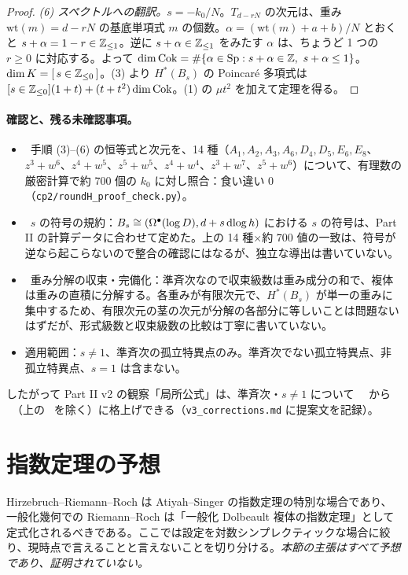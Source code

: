 \begin{proof}
\emph{(6) スペクトルへの翻訳。}$s=-k_0/N$。$T_{d-rN}$ の次元は、重み $\mathrm{wt}(m)=d-rN$ の基底単項式 $m$ の個数。$\alpha=(\mathrm{wt}(m)+a+b)/N$ とおくと $s+\alpha=1-r\in\mathbb Z_{\le1}$。逆に $s+\alpha\in\mathbb Z_{\le1}$ をみたす $\alpha$ は、ちょうど 1 つの $r\ge0$ に対応する。よって $\dim\mathrm{Cok}=\#\{\alpha\in\mathrm{Sp}:s+\alpha\in\Z,\ s+\alpha\le1\}$。$\dim K=[\,s\in\mathbb Z_{\le0}\,]$。(3) より $H^*(B_s)$ の Poincar\'e 多項式は $[s\in\mathbb Z_{\le0}](1+t)+(t+t^2)\dim\mathrm{Cok}$。(1) の $\mu t^2$ を加えて定理を得る。
\end{proof}
\paragraph{確認と、残る未確認事項。}
\begin{itemize}
\item \tV\ 手順 (3)--(6) の恒等式と次元を、14 種（$A_1,A_2,A_3,A_6,D_4,D_5,E_6,E_8$、$z^3+w^6$、$z^4+w^5$、$z^5+w^5$、$z^4+w^4$、$z^3+w^7$、$z^5+w^6$）について、有理数の厳密計算で約 700 個の $k_0$ に対し照合：食い違い 0（\texttt{cp2/roundH\_proof\_check.py}）。
\item \tQ\ $s$ の符号の規約：$B_s\cong(\Omega^\bullet(\log D),d+s\,\mathrm{dlog}\, h)$ における $s$ の符号は、Part II の計算データに合わせて定めた。上の 14 種×約 700 値の一致は、符号が逆なら起こらないので整合の確認にはなるが、独立な導出は書いていない。
\item \tQ\ 重み分解の収束・完備化：準斉次なので収束級数は重み成分の和で、複体は重みの直積に分解する。各重みが有限次元で、$H^*(B_s)$ が単一の重みに集中するため、有限次元の茎の次元が分解の各部分に等しいことは問題ないはずだが、形式級数と収束級数の比較は丁寧に書いていない。
\item 適用範囲：$s\ne1$、準斉次の孤立特異点のみ。準斉次でない孤立特異点、非孤立特異点、$s=1$ は含まない。
\end{itemize}
したがって Part II v2 の観察「局所公式」は、準斉次・$s\ne1$ について \tV\ \tK\ から \tP\ （上の \tQ\ を除く）に格上げできる（\texttt{v3\_corrections.md} に提案文を記録）。

\section{指数定理の予想}\label{sec:index}
Hirzebruch--Riemann--Roch は Atiyah--Singer の指数定理の特別な場合であり、一般化幾何での Riemann--Roch は「一般化 Dolbeault 複体の指数定理」として定式化されるべきである。ここでは設定を対数シンプレクティックな場合に絞り、現時点で言えることと言えないことを切り分ける。\emph{本節の主張はすべて予想であり、証明されていない。}

